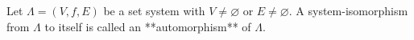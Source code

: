 Let $\Lambda = (V, f, E)$ be a set system with $V \neq \varnothing$ or $E \neq \varnothing$. A system-isomorphism from $\Lambda$ to itself is called an **automorphism** of $\Lambda$.
